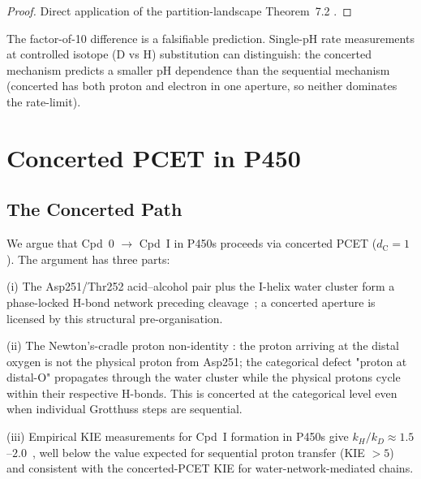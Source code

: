 \documentclass[11pt,twocolumn,a4paper]{article}
\theoremstyle{definition}
\theoremstyle{remark}
\newcommand{\dC}{d_{\mathrm{C}}}
\begin{document}
\begin{proof}
Direct application of the partition-landscape Theorem~7.2
\citep{sachikonye2025_landscape}.
\end{proof}

The factor-of-10 difference is a falsifiable prediction. Single-pH rate
measurements at controlled isotope (D vs H) substitution can distinguish:
the concerted mechanism predicts a smaller pH dependence than the
sequential mechanism (concerted has both proton and electron in one
aperture, so neither dominates the rate-limit).

\section{Concerted PCET in P450}
\label{sec:concerted_vs_sequential}

\subsection{The Concerted Path}

We argue that Cpd~0 $\to$ Cpd~I in P450s proceeds via concerted PCET
($\dC = 1$). The argument has three parts:

(i) The Asp251/Thr252 acid--alcohol pair plus the I-helix water cluster
form a phase-locked H-bond network preceding cleavage~\citep{schlichting2000};
a concerted aperture is licensed by this structural pre-organisation.

(ii) The Newton's-cradle proton non-identity \citep{sachikonye2025_flux}:
the proton arriving at the distal oxygen is not the physical proton from
Asp251; the categorical defect "proton at distal-O" propagates through the
water cluster while the physical protons cycle within their respective
H-bonds. This is concerted at the categorical level even when individual
Grotthuss steps are sequential.

(iii) Empirical KIE measurements for Cpd~I formation in P450s give
$k_H/k_D \approx 1.5$--$2.0$~\citep{vatsis2002}, well below the value
expected for sequential proton transfer (KIE $> 5$) and consistent with the
concerted-PCET KIE for water-network-mediated chains.
\end{document}
